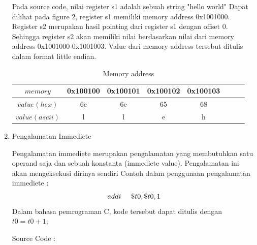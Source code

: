 \documentclass{class}
\begin{document}
\begin{enumerate}
      Pada source code, nilai register s1 adalah sebuah string "hello world"
      Dapat dilihat pada figure 2, register s1 memiliki memory address 0x1001000.
      Register s2 merupakan hasil pointing dari register s1 dengan offset 0. 
      Sehingga register s2 akan memiliki nilai berdasarkan nilai dari memory address 0x1001000-0x1001003.
      Value dari memory address tersebut ditulis dalam format little endian.
      \begin{table}
          \begin{tabular}{|c|c|c|c|c|c|c|c|}
              \hline
              $memory$ & 0x100100 & 0x100101 & 0x100102 & 0x100103 \\ \hline
              $value (hex)$ & 6c & 6c & 65 & 68 \\ \hline
              $value (ascii)$ & l & l & e & h \\ \hline
          \end{tabular}
          \caption{Memory address}
      \end{table}
      
      \item Pengalamatan Immediete
      
      Pengalamatan immediete merupakan pengalamatan yang membutuhkan satu operand saja dan sebuah konstanta (immediete value).
      Pengalamatan ini akan mengeksekusi dirinya sendiri
      Contoh dalam penggunaan pengalamatan immediete :
      $$addi \hspace{0.5cm} \$t0,\$t0,1$$
      Dalam bahasa pemrograman C, kode tersebut dapat ditulis dengan $t0 = t0+1;$

      Source Code : 
      
      

\end{enumerate}
\end{document}
